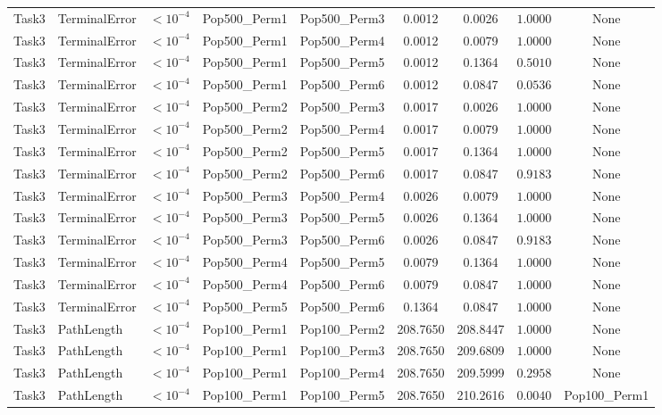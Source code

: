 \documentclass[8pt]{article}
\begin{document}
\begin{longtable}{llccccccc}
Task3 & TerminalError & $< 10^{-4}$ & Pop500\_Perm1 & Pop500\_Perm3 & 0.0012 & 0.0026 & $1.0000$ & None \\
Task3 & TerminalError & $< 10^{-4}$ & Pop500\_Perm1 & Pop500\_Perm4 & 0.0012 & 0.0079 & $1.0000$ & None \\
Task3 & TerminalError & $< 10^{-4}$ & Pop500\_Perm1 & Pop500\_Perm5 & 0.0012 & 0.1364 & $0.5010$ & None \\
Task3 & TerminalError & $< 10^{-4}$ & Pop500\_Perm1 & Pop500\_Perm6 & 0.0012 & 0.0847 & $0.0536$ & None \\
Task3 & TerminalError & $< 10^{-4}$ & Pop500\_Perm2 & Pop500\_Perm3 & 0.0017 & 0.0026 & $1.0000$ & None \\
Task3 & TerminalError & $< 10^{-4}$ & Pop500\_Perm2 & Pop500\_Perm4 & 0.0017 & 0.0079 & $1.0000$ & None \\
Task3 & TerminalError & $< 10^{-4}$ & Pop500\_Perm2 & Pop500\_Perm5 & 0.0017 & 0.1364 & $1.0000$ & None \\
Task3 & TerminalError & $< 10^{-4}$ & Pop500\_Perm2 & Pop500\_Perm6 & 0.0017 & 0.0847 & $0.9183$ & None \\
Task3 & TerminalError & $< 10^{-4}$ & Pop500\_Perm3 & Pop500\_Perm4 & 0.0026 & 0.0079 & $1.0000$ & None \\
Task3 & TerminalError & $< 10^{-4}$ & Pop500\_Perm3 & Pop500\_Perm5 & 0.0026 & 0.1364 & $1.0000$ & None \\
Task3 & TerminalError & $< 10^{-4}$ & Pop500\_Perm3 & Pop500\_Perm6 & 0.0026 & 0.0847 & $0.9183$ & None \\
Task3 & TerminalError & $< 10^{-4}$ & Pop500\_Perm4 & Pop500\_Perm5 & 0.0079 & 0.1364 & $1.0000$ & None \\
Task3 & TerminalError & $< 10^{-4}$ & Pop500\_Perm4 & Pop500\_Perm6 & 0.0079 & 0.0847 & $1.0000$ & None \\
Task3 & TerminalError & $< 10^{-4}$ & Pop500\_Perm5 & Pop500\_Perm6 & 0.1364 & 0.0847 & $1.0000$ & None \\
Task3 & PathLength & $< 10^{-4}$ & Pop100\_Perm1 & Pop100\_Perm2 & 208.7650 & 208.8447 & $1.0000$ & None \\
Task3 & PathLength & $< 10^{-4}$ & Pop100\_Perm1 & Pop100\_Perm3 & 208.7650 & 209.6809 & $1.0000$ & None \\
Task3 & PathLength & $< 10^{-4}$ & Pop100\_Perm1 & Pop100\_Perm4 & 208.7650 & 209.5999 & $0.2958$ & None \\
Task3 & PathLength & $< 10^{-4}$ & Pop100\_Perm1 & Pop100\_Perm5 & 208.7650 & 210.2616 & $0.0040$ & Pop100\_Perm1 \\

\end{longtable}
\end{document}
